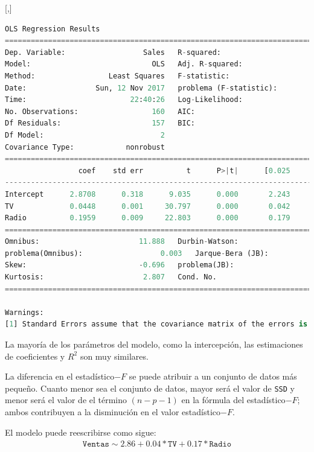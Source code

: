 [,]{}
\tiny
\begin{lstlisting}[language=Python]
                            OLS Regression Results
==============================================================================
Dep. Variable:                  Sales   R-squared:                       0.906
Model:                            OLS   Adj. R-squared:                  0.904
Method:                 Least Squares   F-statistic:                     753.7
Date:                Sun, 12 Nov 2017   problema (F-statistic):           3.22e-81
Time:                        22:40:26   Log-Likelihood:                -299.60
No. Observations:                 160   AIC:                             605.2
Df Residuals:                     157   BIC:                             614.4
Df Model:                           2
Covariance Type:            nonrobust
==============================================================================
                 coef    std err          t      P>|t|      [0.025      0.975]
------------------------------------------------------------------------------
Intercept      2.8708      0.318      9.035      0.000       2.243       3.498
TV             0.0448      0.001     30.797      0.000       0.042       0.048
Radio          0.1959      0.009     22.803      0.000       0.179       0.213
==============================================================================
Omnibus:                       11.888   Durbin-Watson:                   2.158
problema(Omnibus):                  0.003   Jarque-Bera (JB):               13.175
Skew:                          -0.696   problema(JB):                      0.00138
Kurtosis:                       2.807   Cond. No.                         438.
==============================================================================

Warnings:
[1] Standard Errors assume that the covariance matrix of the errors is correctly specified.
\end{lstlisting}


La mayoría de los parámetros del modelo, como la intercepción, las estimaciones de coeficientes y $R^2$ son
muy similares.


La diferencia en el estadístico$-F$ se puede atribuir a un conjunto de datos más pequeño. Cuanto menor sea el conjunto de datos, mayor será el valor de \texttt{SSD} y menor será el valor de
el término $(n-p-1)$ en la fórmula del estadístico$-F$; ambos contribuyen a la disminución en el valor estadístico$-F.$


El modelo puede reescribirse como sigue:
\begin{align}
 \texttt{Ventas} \sim 2.86 + 0.04*\texttt{TV} + 0.17*\texttt{Radio}
\end{align}

